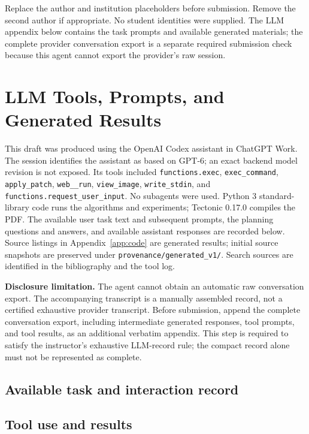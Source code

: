 \documentclass[sigconf,nonacm]{acmart}
\begin{document}
Replace the author and institution placeholders before submission. Remove
the second author if appropriate. No student identities were supplied. The
LLM appendix below contains the task prompts and available generated
materials; the complete provider conversation export is a separate required
submission check because this agent cannot export the provider's raw session.

\section{LLM Tools, Prompts, and Generated Results}
\label{app:llm}
This draft was produced using the OpenAI Codex assistant in ChatGPT Work.
The session identifies the assistant as based on GPT-6; an exact backend model
revision is not exposed. Its tools included \texttt{functions.exec},
\texttt{exec\_command}, \texttt{apply\_patch}, \texttt{web\_\_run},
\texttt{view\_image}, \texttt{write\_stdin}, and
\texttt{functions.request\_user\_input}. No subagents were used. Python 3 standard-library
code runs the algorithms and experiments; Tectonic 0.17.0 compiles the PDF.
The available user task text and subsequent prompts,
the planning questions and answers, and available assistant responses are
recorded below. Source listings in Appendix~\ref{app:code} are generated
results; initial source snapshots are preserved under
\texttt{provenance/generated\_v1/}. Search sources are identified in the
bibliography and the tool log.

\textbf{Disclosure limitation.} The agent cannot obtain an automatic raw
conversation export. The accompanying transcript is a manually assembled
record, not a certified exhaustive provider transcript. Before submission,
append the complete conversation export, including intermediate generated
responses, tool prompts, and tool results, as an additional verbatim appendix.
This step is required to satisfy the instructor's exhaustive LLM-record rule;
the compact record alone must not be represented as complete.

\subsection{Available task and interaction record}
\subsection{Tool use and results}
\end{document}
